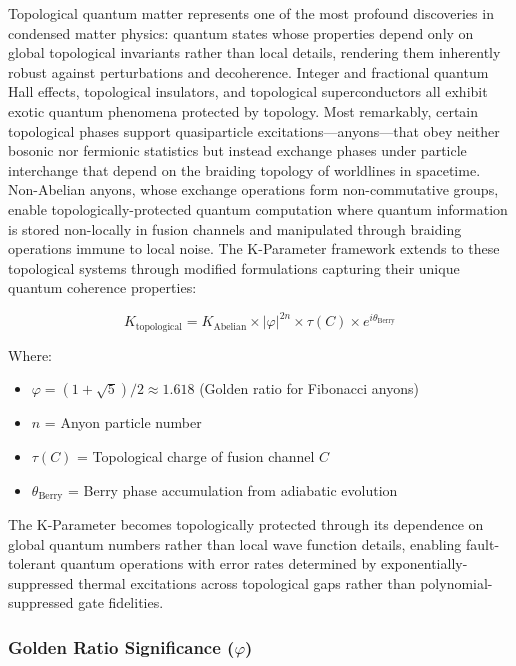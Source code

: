\documentclass[11pt,a4paper,twoside]{article}
\begin{document}
Topological quantum matter represents one of the most profound discoveries in condensed matter physics: quantum states whose properties depend only on global topological invariants rather than local details, rendering them inherently robust against perturbations and decoherence. Integer and fractional quantum Hall effects, topological insulators, and topological superconductors all exhibit exotic quantum phenomena protected by topology. Most remarkably, certain topological phases support quasiparticle excitations---anyons---that obey neither bosonic nor fermionic statistics but instead exchange phases under particle interchange that depend on the braiding topology of worldlines in spacetime. Non-Abelian anyons, whose exchange operations form non-commutative groups, enable topologically-protected quantum computation where quantum information is stored non-locally in fusion channels and manipulated through braiding operations immune to local noise. The K-Parameter framework extends to these topological systems through modified formulations capturing their unique quantum coherence properties:

\begin{theorembox}
\begin{equation}
K_{\text{topological}} = K_{\text{Abelian}} \times |\varphi|^{2n} \times \tau(C) \times e^{i\theta_{\text{Berry}}}
\end{equation}

Where:
\begin{itemize}[leftmargin=*]
    \item $\varphi = (1+\sqrt{5})/2 \approx 1.618$ (Golden ratio for Fibonacci anyons)
    \item $n$ = Anyon particle number
    \item $\tau(C)$ = Topological charge of fusion channel $C$
    \item $\theta_{\text{Berry}}$ = Berry phase accumulation from adiabatic evolution
\end{itemize}
\end{theorembox}

The K-Parameter becomes topologically protected through its dependence on global quantum numbers rather than local wave function details, enabling fault-tolerant quantum operations with error rates determined by exponentially-suppressed thermal excitations across topological gaps rather than polynomial-suppressed gate fidelities.

\subsubsection{Golden Ratio Significance ($\varphi$)}
\end{document}
